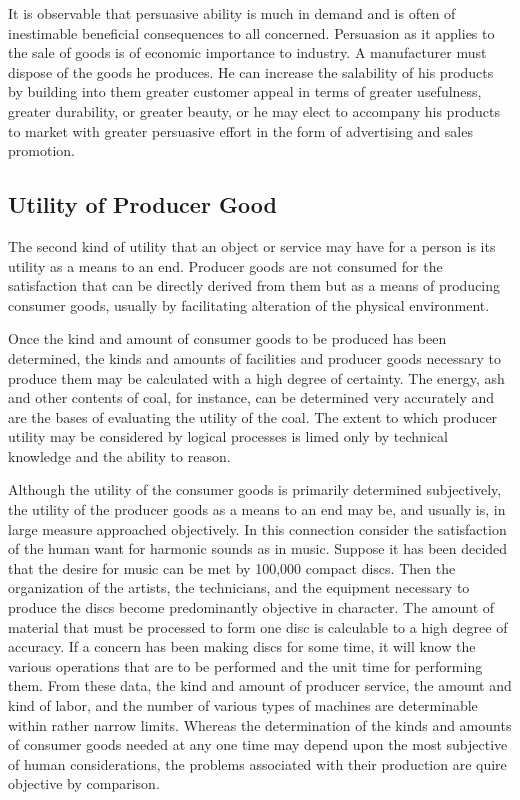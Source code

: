 It is observable that persuasive ability is much in demand and is often of inestimable beneficial consequences to all concerned. Persuasion as it applies to the sale of goods is of economic importance to industry. A manufacturer must dispose of the goods he produces. He can increase the salability of his products by building into them greater customer appeal in terms of greater usefulness, greater durability, or greater beauty, or he may elect to accompany his products to market with greater persuasive effort in the form of advertising and sales promotion.
    
\subsection{Utility of Producer Good}

The second kind of utility that an object or service may have for a person is its utility as a means to an end. Producer goods are not consumed for the satisfaction that can be directly derived from them but as a means of producing consumer goods, usually by facilitating alteration of the physical environment.

Once the kind and amount of consumer goods to be produced has been determined, the kinds and amounts of facilities and producer goods necessary to produce them may be calculated with a high degree of certainty. The energy, ash and other contents of coal, for instance, can be determined very accurately and are the bases of evaluating the utility of the coal. The extent to which producer utility may be considered by logical processes is limed only by technical knowledge and the ability to reason.

Although the utility of the consumer goods is primarily determined subjectively, the utility of the producer goods as a means to an end may be, and usually is, in large measure approached objectively. In this connection consider the satisfaction of the human want for harmonic sounds as in music. Suppose it has been decided that the desire for music can be met by 100,000 compact discs. Then the organization of the artists, the technicians, and the equipment necessary to produce the discs become predominantly objective in character. The amount of material that must be processed to form one disc is calculable to a high degree of accuracy. If a concern has been making discs for some time, it will know the various operations that are to be performed and the unit time for performing them. From these data, the kind and amount of producer service, the amount and kind of labor, and the number of various types of machines are determinable within rather narrow limits. Whereas the determination of the kinds and amounts of consumer goods needed at any one time may depend upon the most subjective of human considerations, the problems associated with their production are quire objective by comparison.
    
